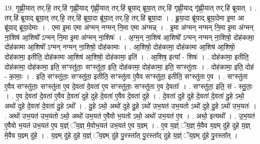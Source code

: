 \documentclass[17pt]{extarticle}
\begin{document}
19. गृ॒ह्णी॒यात् तर्.हि॒ तर्.हि॑ गृह्णी॒याद् गृ॑ह्णी॒यात् तर्.हि॑ ब्रूयाद् ब्रूया॒त् तर्.हि॑ गृह्णी॒याद् गृ॑ह्णी॒यात् तर्.हि॑ ब्रूयात् । . तर्.हि॑ ब्रूयाद् ब्रूया॒त् तर्.हि॒ तर्.हि॑ ब्रूया॒दा ब्रू॑या॒त् तर्.हि॒ तर्.हि॑ ब्रूया॒दा । . ब्रू॒या॒दा ब्रू॑याद् ब्रूया॒देमा इ॒मा आ ब्रू॑याद् ब्रूया॒देमाः । . एमा इ॒मा एमा अ॑ग्मन् नग्मन् नि॒मा एमा अ॑ग्मन्न् । . इ॒मा अ॑ग्मन् नग्मन् नि॒मा इ॒मा अ॑ग्मन् ना॒शिष॑ आ॒शिषो᳚ ऽग्मन् नि॒मा इ॒मा अ॑ग्मन् ना॒शिषः॑ । . अ॒ग्म॒न् ना॒शिष॑ आ॒शिषो᳚ ऽग्मन् नग्मन् ना॒शिषो॒ दोह॑कामा॒ दोह॑कामा आ॒शिषो᳚ ऽग्मन् नग्मन् ना॒शिषो॒ दोह॑कामाः । . आ॒शिषो॒ दोह॑कामा॒ दोह॑कामा आ॒शिष॑ आ॒शिषो॒ दोह॑कामा॒ इतीति॒ दोह॑कामा आ॒शिष॑ आ॒शिषो॒ दोह॑कामा॒ इति॑ । . आ॒शिष॒ इत्या᳚ - शिषः॑ । . दोह॑कामा॒ इतीति॒ दोह॑कामा॒ दोह॑कामा॒ इति॒ सꣳस्तु॑ताः॒ सꣳस्तु॑ता॒ इति॒ दोह॑कामा॒ दोह॑कामा॒ इति॒ सꣳस्तु॑ताः । . दोह॑कामा॒ इति॒ दोह॑ - का॒माः॒ । . इति॒ सꣳस्तु॑ताः॒ सꣳस्तु॑ता॒ इतीति॒ सꣳस्तु॑ता ए॒वैव सꣳस्तु॑ता॒ इतीति॒ सꣳस्तु॑ता ए॒व । . सꣳस्तु॑ता ए॒वैव सꣳस्तु॑ताः॒ सꣳस्तु॑ता ए॒व दे॒वता॑ दे॒वता॑ ए॒व सꣳस्तु॑ताः॒ सꣳस्तु॑ता ए॒व दे॒वताः᳚ । . सꣳस्तु॑ता॒ इति॒ सं - स्तु॒ताः॒ । . ए॒व दे॒वता॑ दे॒वता॑ ए॒वैव दे॒वता॑ दुहे दुहे दे॒वता॑ ए॒वैव दे॒वता॑ दुहे । . दे॒वता॑ दुहे दुहे दे॒वता॑ दे॒वता॑ दु॒हे ऽथो॒ अथो॑ दुहे दे॒वता॑ दे॒वता॑ दु॒हे ऽथो᳚ । . दु॒हे ऽथो॒ अथो॑ दुहे दु॒हे ऽथो॑ उभ॒यत॑ उभ॒यतो ऽथो॑ दुहे दु॒हे ऽथो॑ उभ॒यतः॑ । . अथो॑ उभ॒यत॑ उभ॒यतो ऽथो॒ अथो॑ उभ॒यत॑ ए॒वैवो भ॒यतो ऽथो॒ अथो॑ उभ॒यत॑ ए॒व । . अथो॒ इत्यथो᳚ । . उ॒भ॒यत॑ ए॒वैवो भ॒यत॑ उभ॒यत॑ ए॒व य॒ज्ञ्ं ॅय॒ज्ञ् मे॒वोभ॒यत॑ उभ॒यत॑ ए॒व य॒ज्ञ्म् । . ए॒व य॒ज्ञ्ं ॅय॒ज्ञ् मे॒वैव य॒ज्ञ्म् दु॑हे दुहे य॒ज्ञ् मे॒वैव य॒ज्ञ्म् दु॑हे । . य॒ज्ञ्म् दु॑हे दुहे य॒ज्ञ्ं ॅय॒ज्ञ्म् दु॑हे पु॒रस्ता᳚त् पु॒रस्ता᳚द् दुहे य॒ज्ञ्ं ॅय॒ज्ञ्म् दु॑हे पु॒रस्ता᳚त् । \newline
\end{document}
